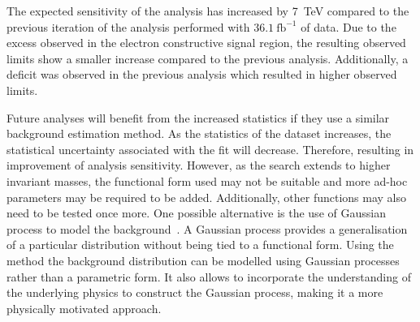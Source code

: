 The expected sensitivity of the analysis has increased by \SI{7}{\tera\electronvolt} compared to the previous iteration of the analysis performed with $\SI{36.1}{\femto\barn}^{-1}$ of data. Due to the excess observed in the electron constructive signal region, the resulting  observed limits show a smaller increase compared to the previous analysis. Additionally, a deficit was observed in the previous analysis which resulted in higher observed limits. 

Future analyses will benefit from the increased statistics if they use a similar background estimation method. As the statistics of the dataset increases, the statistical uncertainty associated with the fit will decrease. Therefore, resulting in improvement of analysis sensitivity. However, as the search extends to higher invariant masses, the functional form used may not be suitable and more ad-hoc parameters may be required to be added. Additionally, other functions may also need to be tested once more. One possible alternative is the use of Gaussian process to model the background~\cite{frate2017modeling}. A Gaussian process provides a generalisation of a particular distribution without being tied to a functional form. Using the method the background distribution can be modelled using Gaussian processes rather than a parametric form. It also allows to incorporate the understanding of the underlying physics to construct the Gaussian process, making it a more physically motivated approach. 


